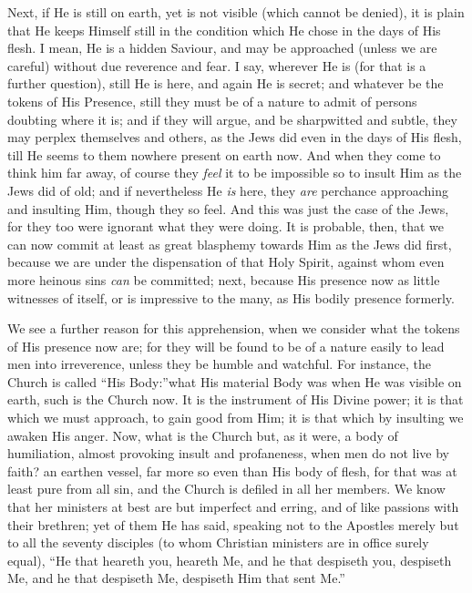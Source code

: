Next, if He is still on earth, yet is not visible (which cannot be
denied), it is plain that He keeps Himself still in the condition
which He chose in the days of His flesh. I mean, He is a hidden
Saviour, and may be approached (unless we are careful) without due
reverence and fear. I say, wherever He is (for that is a further
question), still He is here, and again He is secret; and whatever be
the tokens of His Presence, still they must be of a nature to admit of
persons doubting where it is; and if they will argue, and be
sharpwitted and subtle, they may perplex themselves and others, as the
Jews did even in the days of His flesh, till He seems to them nowhere
present on earth now. And when they come to think him far away, of
course they \emph{feel} it to be impossible so to insult Him as the
Jews did of old; and if nevertheless He \emph{is} here, they \emph{are}
perchance approaching and insulting Him, though they so feel. And this
was just the case of the Jews, for they too were ignorant what they
were doing. It is probable, then, that we can now commit at least as
great blasphemy towards Him as the Jews did first, because we are
under the dispensation of that Holy Spirit, against whom even more
heinous sins \emph{can} be committed; next, because His presence now
as little witnesses of itself, or is impressive to the many, as His
bodily presence formerly.

We see a further reason for this apprehension, when we consider
what the tokens of His presence now are; for they will be found to be
of a nature easily to lead men into irreverence, unless they be humble
and watchful. For instance, the Church is called ``His Body:''\emph{}what His material Body was when He was visible on earth, such is
the Church now. It is the instrument of His Divine power; it is that
which we must approach, to gain good from Him; it is that which by
insulting we awaken His anger. Now, what is the Church but, as it
were, a body of humiliation, almost provoking insult and profaneness,
when men do not live by faith? an earthen vessel, far more so even
than His body of flesh, for that was at least pure from all sin, and
the Church is defiled in all her members. We know that her ministers
at best are but imperfect and erring, and of like passions with their
brethren; yet of them He has said, speaking not to the Apostles merely
but to all the seventy disciples (to whom Christian ministers are in
office surely equal), ``He that heareth you, heareth Me, and he
that despiseth you, despiseth Me, and he that despiseth Me, despiseth
Him that sent Me.''

